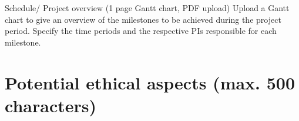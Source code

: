 \documentclass[a4paper,12pt]{article}
\begin{document}
Schedule/ Project overview (1 page Gantt chart, PDF upload)
Upload a Gantt chart to give an overview of the milestones to be achieved during the project period. Specify the time periods and the respective PIs responsible for each milestone.

\section{Potential ethical aspects (max. 500 characters)}

\end{document}
